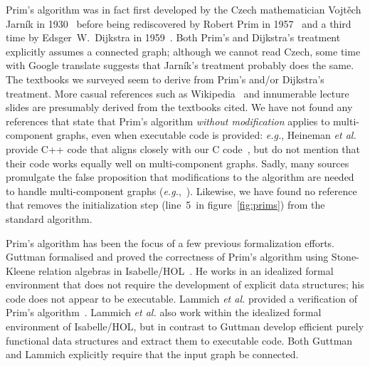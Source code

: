 Prim's algorithm was in fact first developed by the Czech mathematician Vojt\v{e}ch Jarn\'{i}k in 1930~\cite{prim1:jarnik} before being rediscovered by Robert Prim in 1957~\cite{prim2:prim} and a third time by Edsger~W.~Dijkstra in 1959~\cite{DBLP:journals/nm/Dijkstra59}.  Both Prim's and Dijkstra's treatment explicitly assumes a connected graph; although we cannot read Czech, some time with Google translate suggests that Jarn\'{i}k's treatment probably does the same.  The textbooks we surveyed \cite{kepnergilbert,sedgewick,DBLP:books/daglib/0029345,rozen,DBLP:books/daglib/0022194,clrs,DBLP:books/daglib/0015106} seem to derive from Prim's and/or Dijkstra's treatment.
More casual references such as Wikipedia~\cite{prim:wiki} and innumerable lecture slides are presumably derived from the textbooks cited.  We have not found any references that state that Prim's algorithm \emph{without modification} applies to multi-component graphs, even when executable code is provided: \emph{e.g.}, Heineman \emph{et al.} provide C++ code that aligns closely with our C code~\cite{heineman2008algorithms}, but do not mention that their code works equally well on multi-component graphs.  Sadly, many sources promulgate the false proposition that modifications to the algorithm are needed to handle multi-component graphs (\emph{e.g.},~\cite{kepnergilbert,sedgewick,DBLP:books/daglib/0029345,rozen,prim:wiki}).  Likewise, we have found no reference that removes the initialization step (line~5~in figure~\ref{fig:prims}) from the standard algorithm.

Prim's algorithm has been the focus of a few previous formalization efforts.  Guttman formalised and proved the correctness of Prim's algorithm using Stone-Kleene relation algebras in Isabelle/HOL~\cite{DBLP:conf/ictac/Guttmann16}.  He works in an idealized formal environment that does not require the development of explicit data structures; his code does not appear to be executable.  Lammich \emph{et al.} provided a verification of Prim's algorithm~\cite{DBLP:journals/afp/LammichN19}.  Lammich \emph{et al.} also work within the idealized formal environment of Isabelle/HOL, but in contrast to Guttman develop efficient purely functional data structures and extract them to executable code.  Both Guttman and Lammich explicitly require that the input graph be connected. %





